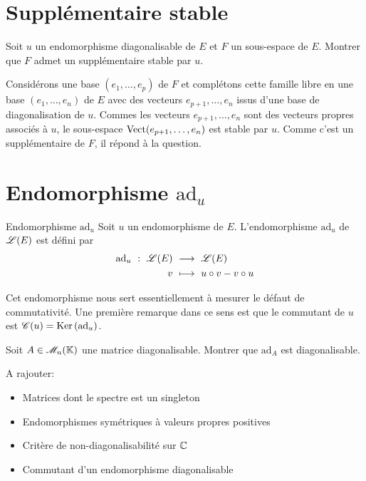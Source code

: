 \section{Supplémentaire stable}

\begin{exercice}
    Soit $u$ un endomorphisme diagonalisable de $E$ et $F$ un sous-espace de $E$. Montrer que $F$ admet un supplémentaire stable par $u$. 
\end{exercice}

\begin{solution}
    Considérons une base $(e_1, \dots, e_p)$ de $F$ et complétons cette famille libre en une base $(e_1, \dots, e_n)$ de $E$ avec des vecteurs $e_{p+1}, \dots, e_n$ issus d'une base de diagonalisation de $u$. Commes les vecteurs $e_{p+1}, \dots, e_n$ sont des vecteurs propres associés à $u$, le sous-espace $\mathrm{Vect}(e_{p+1}, \dots, e_n)$ est stable par $u$. Comme c'est un supplémentaire de $F$, il répond à la question. 
\end{solution} 

\section{Endomorphisme \texorpdfstring{$\mathrm{ad}_u$}{ad_u}}
\begin{defi}{Endomorphisme $\mathrm{ad}_u$}
    Soit $u$ un endomorphisme de $E$. L'endomorphisme $\mathrm{ad}_u$ de $\mathscr{L}(E)$ est défini par
    \begin{alignat*}{2}
        \mathrm{ad}_u\ :\ \mathscr{L}(E)\ &\longrightarrow\ \mathscr{L}(E)\\
        v\ &\longmapsto\ u \circ v - v \circ u
    \end{alignat*}
\end{defi}

Cet endomorphisme nous sert essentiellement à mesurer le défaut de commutativité. Une première remarque dans ce sens est que le commutant de $u$ est $\mathscr{C}(u) = \mathrm{Ker}\,(\mathrm{ad}_u)$. 

\begin{exercice}
    Soit $A \in \mathscr{M}_n(\mathbb{K})$ une matrice diagonalisable. Montrer que $\mathrm{ad}_A$ est diagonalisable.
\end{exercice}

A rajouter:
\begin{itemize}
    \item Matrices dont le spectre est un singleton
    \item Endomorphismes symétriques à valeurs propres positives
    \item Critère de non-diagonalisabilité sur $\mathbb{C}$
    \item Commutant d'un endomorphisme diagonalisable 
\end{itemize}

